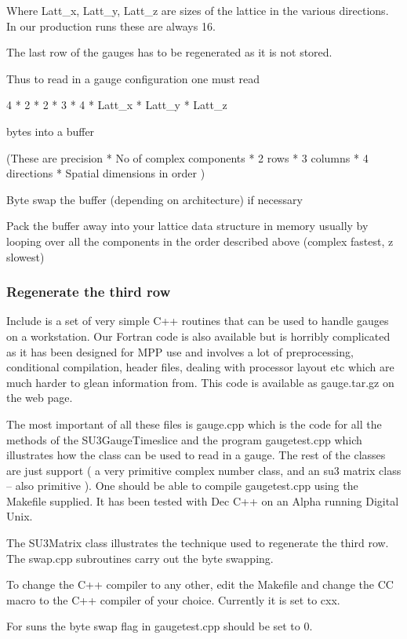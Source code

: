 \documentclass[12pt]{article}
\begin{document}
Where Latt\_x, Latt\_y, Latt\_z are sizes of the lattice in the various directions.
In our production runs these are always 16.

The last row of the gauges has to be regenerated as it is not stored.

Thus to read in a gauge configuration one must 
read

4 * 2 * 2 * 3 * 4 * Latt\_x * Latt\_y * Latt\_z 

bytes into a buffer

(These are 
        precision * No of complex components * 2 rows * 3 columns *
           4 directions * Spatial dimensions  in order
)

Byte swap the buffer (depending on architecture) if necessary

Pack the buffer away into your lattice data structure in memory usually by
looping over all the components in the order described above 
(complex fastest, z slowest)

\subsubsection{Regenerate the third row}
Include is a set of very simple C++ routines that can be used
to handle gauges on a workstation. Our Fortran code is also
available but is horribly complicated as it has been designed for
MPP use and involves a lot of preprocessing, conditional compilation,
header files,  dealing with processor layout etc which are much 
harder to glean information from. This code is available as gauge.tar.gz
on the web page.

The most important of all these files is gauge.cpp which is the 
code for all the methods of the SU3GaugeTimeslice and the program
gaugetest.cpp which illustrates how the class can be used to read in 
a gauge. The rest of the classes are just support ( a very primitive
complex number class, and an su3 matrix class -- also primitive ).
One should be able to compile gaugetest.cpp using the Makefile supplied.
It has been tested with Dec C++ on an Alpha running Digital Unix.

The SU3Matrix class illustrates the technique used to regenerate the 
third row. The swap.cpp subroutines carry out the byte swapping.

To change the C++ compiler to any other, edit the Makefile and change
the CC macro to the C++ compiler of your choice. Currently it is set to 
cxx.

For suns the byte swap flag in gaugetest.cpp should be set to 0.
\end{document}
